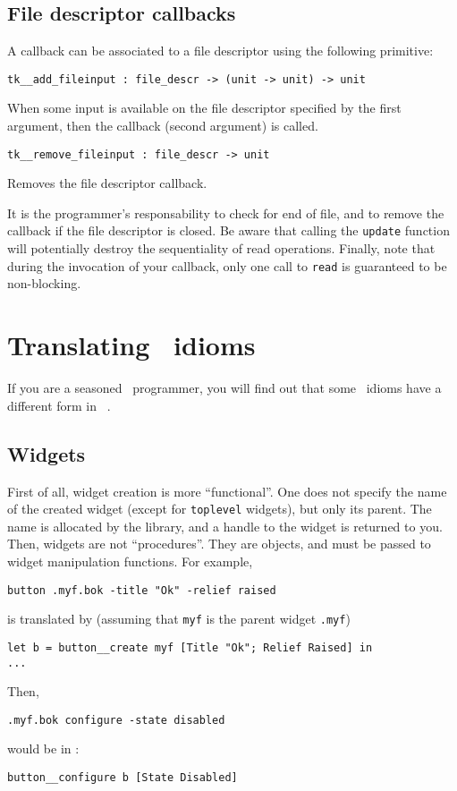 \subsection{File descriptor callbacks}
A callback can be associated to a file descriptor using the following
primitive:
\begin{verbatim}
tk__add_fileinput : file_descr -> (unit -> unit) -> unit
\end{verbatim} 
When some input is available on the file descriptor specified by the first
argument, then the callback (second argument) is called.
\begin{verbatim}
tk__remove_fileinput : file_descr -> unit
\end{verbatim} 
Removes the file descriptor callback. 

It is the programmer's responsability
to check for end of file, and to remove the callback if the file descriptor
is closed. Be aware that calling the \verb|update| function will potentially
destroy the sequentiality of read operations. Finally, note that during the
invocation of your callback, only one call to \verb|read| is guaranteed to
be non-blocking.

\section{Translating \tk\ idioms}
If you are a seasoned \tk\ programmer, you will find out that some \tk\
idioms have a different form in \camltk\ .

\subsection{Widgets}
First of all, widget creation is more ``functional''. One does not specify
the name of the created widget (except for \verb|toplevel| widgets), but
only its parent. The name is allocated by the library, and a handle to the
widget is returned to you. Then, widgets are not ``procedures''. They are
objects, and must be passed to widget manipulation functions.
For example,
\begin{verbatim}
button .myf.bok -title "Ok" -relief raised
\end{verbatim} 
is translated by (assuming that \verb|myf| is the parent widget \verb|.myf|)
\begin{verbatim}
let b = button__create myf [Title "Ok"; Relief Raised] in
...
\end{verbatim} 
Then, 
\begin{verbatim}
.myf.bok configure -state disabled
\end{verbatim} 
would be in \caml:
\begin{verbatim}
button__configure b [State Disabled]
\end{verbatim} 

